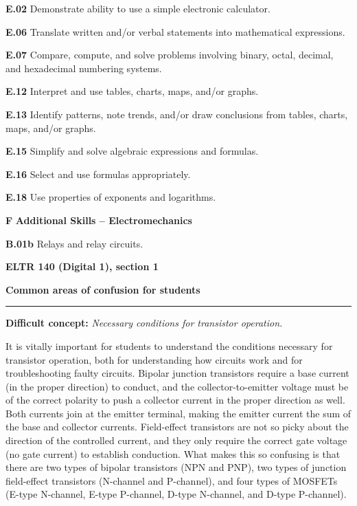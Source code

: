 \item{\bf E.02} Demonstrate ability to use a simple electronic calculator.
\item{\bf E.06} Translate written and/or verbal statements into mathematical expressions.
\item{\bf E.07} Compare, compute, and solve problems involving binary, octal, decimal, and hexadecimal numbering systems.
\item{\bf E.12} Interpret and use tables, charts, maps, and/or graphs.
\item{\bf E.13} Identify patterns, note trends, and/or draw conclusions from tables, charts, maps, and/or graphs.
\item{\bf E.15} Simplify and solve algebraic expressions and formulas.
\item{\bf E.16} Select and use formulas appropriately.
\item{\bf E.18} Use properties of exponents and logarithms.
\medskip

\vskip 5pt

\medskip
\item{\bf F} {\bf Additional Skills -- Electromechanics}
\item{\bf B.01b} Relays and relay circuits.
\medskip





\vfil \eject

\centerline{\bf ELTR 140 (Digital 1), section 1} \bigskip 
 
\vskip 10pt

\noindent
{\bf Common areas of confusion for students}

\vskip 5pt

\hrule \vskip 5pt

\vskip 10pt

\noindent
{\bf Difficult concept: } {\it Necessary conditions for transistor operation.}

It is vitally important for students to understand the conditions necessary for transistor operation, both for understanding how circuits work and for troubleshooting faulty circuits.  Bipolar junction transistors require a base current (in the proper direction) to conduct, and the collector-to-emitter voltage must be of the correct polarity to push a collector current in the proper direction as well.  Both currents join at the emitter terminal, making the emitter current the sum of the base and collector currents.  Field-effect transistors are not so picky about the direction of the controlled current, and they only require the correct gate voltage (no gate current) to establish conduction.  What makes this so confusing is that there are two types of bipolar transistors (NPN and PNP), two types of junction field-effect transistors (N-channel and P-channel), and four types of MOSFETs (E-type N-channel, E-type P-channel, D-type N-channel, and D-type P-channel).

